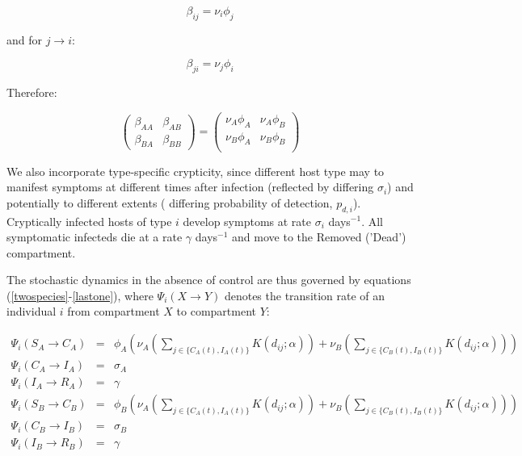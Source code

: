 \documentclass[11pt,letterpaper]{article}
\begin{document}
\begin{equation}
\beta_{ij} = \nu_{i} \phi_{j}
\end{equation}

and for $j \rightarrow i$:

\begin{equation}
\beta_{ji}= \nu_{j} \phi_{i}
\end{equation}

Therefore:

\begin{equation}
    \begin{pmatrix}
\beta_{AA} & \beta_{AB} \\
\beta_{BA} & \beta_{BB}
 
\end{pmatrix} = 
\begin{pmatrix}
\nu_{A} \phi_{A} & \nu_{A} \phi_{B} \\
\nu_{B} \phi_{A} & \nu_{B} \phi_{B} \\
\end{pmatrix}
\end{equation}

We also incorporate type-specific crypticity, since different host type may to manifest symptoms at different times after infection (reflected by differing $\sigma_{i}$) and potentially to different extents ( differing probability of detection, $p_{d,i}$). Cryptically infected hosts of type $i$ develop symptoms at rate $\sigma_i$ days$^{-1}$. All symptomatic infecteds die at a rate $\gamma$ days$^{-1}$ and move to the Removed ('Dead') compartment.

The stochastic dynamics in the absence of control are thus governed by equations (\ref{twospecies}-\ref{lastone}), where $\Psi_{i}(X \rightarrow Y)$ denotes the transition rate of an individual $i$ from compartment $X$ to compartment $Y$:


    
\begin{eqnarray}    
	\label{twospecies}
\Psi_{i} \left( S_{A} \rightarrow C_{A}\right) &=& \phi_{A} \left( \nu_{A} \left( \sum_{j \in \{C_{A}(t), I_{A}(t)\}}^{}  K(d_{ij}; \alpha) \right) + \nu_{B} \left(\sum_{j \in \{C_{B}(t), I _{B}(t) \}}^{} K(d_{ij}; \alpha) \right) \right) \\
   \Psi_{i} \left( C_{A} \rightarrow I_{A}\right)  &=&  \sigma_{A} \\
   \Psi_{i} \left(I_{A} \rightarrow R _{A}\right) &=& \gamma \\
    \Psi_{i} \left( S_{B} \rightarrow C_{B}\right) &=& \phi_{B} \left( \nu_{A} \left( \sum_{j \in \{ C_{A}(t), I_{A}(t) \}}^{} K(d_{ij}; \alpha) \right) + \nu_{B} \left(\sum_{j \in \{C_{B}(t), I _{B}(t) \}}^{} K(d_{ij}; \alpha) \right) \right) \\
   \Psi_{i} \left( C_{B} \rightarrow I_{B}\right) &=&  \sigma_{B} \\
  \Psi_{i} \left(I_{B} \rightarrow R_{B}\right) &=& \gamma  \label{lastone}
\end{eqnarray}
\end{document}
